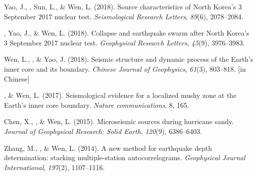 \begin{etaremune}
\item
    Yao, J., \Tian\CF, Sun, L., \& Wen, L. (2018).
	Source characteristics of North Korea's 3 September 2017 nuclear test.
    \textit{Seismological Research Letters}, \textit{89}(6), 2078--2084.
\item
    \Tian, Yao, J., \& Wen, L. (2018).
    Collapse and earthquake swarm after North Korea's 3 September 2017 nuclear test.
    \textit{Geophysical Research Letters}, \textit{45}(9), 3976--3983.
\item
    Wen, L., \Tian, \& Yao, J. (2018).
    Seismic structure and dynamic process of the Earth's inner core and its boundary.
    \textit{Chinese Journal of Geophysics}, \textit{61}(3), 803--818.
     [in Chinese]
\item
    \Tian, \& Wen, L. (2017).
    Seismological evidence for a localized mushy zone at the Earth's inner core boundary.
    \textit{Nature communications}, 8, 165.
\item
    Chen, X., \Tian, \& Wen, L. (2015).
    Microseismic sources during hurricane sandy.
    \textit{Journal of Geophysical Research: Solid Earth}, \textit{120}(9), 6386--6403.
\item Zhang, M., \Tian, \& Wen, L. (2014).
    A new method for earthquake depth determination: stacking multiple-station autocorrelograms.
    \textit{Geophysical Journal International}, \textit{197}(2), 1107--1116.
\end{etaremune}



